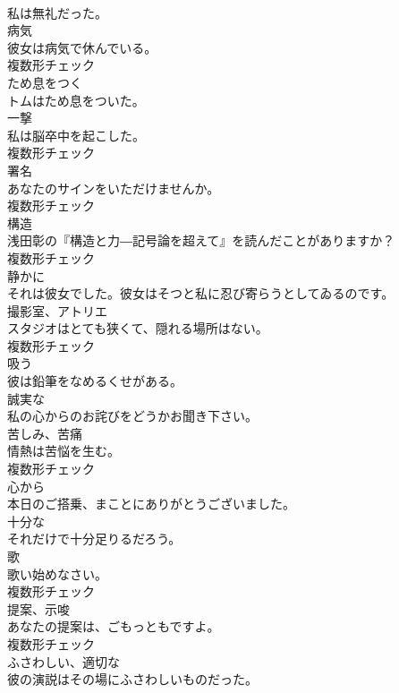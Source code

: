 \documentclass[8pt]{extreport}
\begin{document}
\begin{CJK}{UTF8}{min}
\\	私は無礼だった。	
\\	[名詞]	病気	
\\	彼女は病気で休んでいる。	
\\	複数形チェック
\\	[動詞]	ため息をつく	
\\	トムはため息をついた。	
\\	[名詞]	一撃	
\\	私は脳卒中を起こした。	
\\	複数形チェック
\\	[名詞]	署名	
\\	あなたのサインをいただけませんか。	
\\	複数形チェック
\\	[名詞]	構造	
\\	浅田彰の『構造と力―記号論を超えて』を読んだことがありますか？	
\\	複数形チェック
\\	[副詞]	静かに	
\\	それは彼女でした。彼女はそつと私に忍び寄らうとしてゐるのです。	
\\	[名詞]	撮影室、アトリエ	
\\	スタジオはとても狭くて、隠れる場所はない。	
\\	複数形チェック
\\	[動詞]	吸う	
\\	彼は鉛筆をなめるくせがある。	
\\	[形容詞]	誠実な	
\\	私の心からのお詫びをどうかお聞き下さい。	
\\	[名詞]	苦しみ、苦痛	
\\	情熱は苦悩を生む。	
\\	複数形チェック
\\	[副詞]	心から	
\\	本日のご搭乗、まことにありがとうございました。	
\\	[形容詞]	十分な	
\\	それだけで十分足りるだろう。	
\\	[名詞]	歌	
\\	歌い始めなさい。	
\\	複数形チェック
\\	[名詞]	提案、示唆	
\\	あなたの提案は、ごもっともですよ。	
\\	複数形チェック
\\	[形容詞]	ふさわしい、適切な	
\\	彼の演説はその場にふさわしいものだった。	

\end{CJK}
\end{document}
